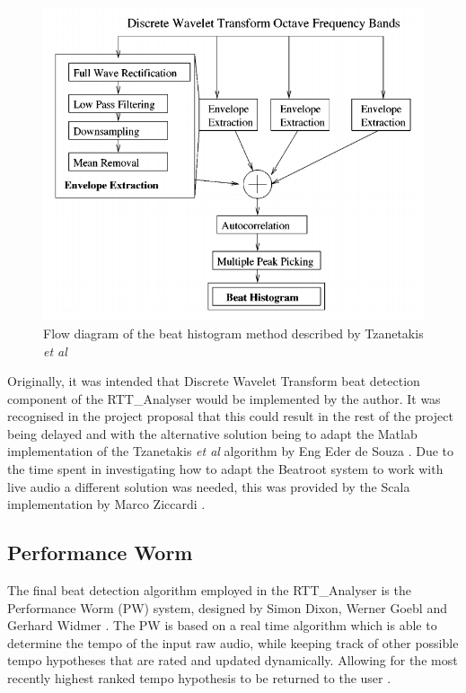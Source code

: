 \documentclass[a4paper, 11pt]{article}
\begin{document}
\begin{figure}[ht]
	\centering
	\includegraphics[scale=0.35]{images/dwtflow.jpg}
	\caption{Flow diagram of the beat histogram method described by Tzanetakis \textit{et al} \cite{tzane3}}
	\label{fig: dwtFlow}
\end{figure}


Originally, it was intended that Discrete Wavelet Transform beat detection component of the RTT\_Analyser would be implemented by the author. It was recognised in the project proposal that this could result in the rest of the project being delayed and with the alternative solution being to adapt the Matlab implementation of the Tzanetakis \textit{et al} \cite{tzane1} algorithm by Eng Eder de Souza \cite{desouze}. Due to the time spent in investigating how to adapt the Beatroot system to work with live audio a different solution was needed, this was provided by the Scala implementation by Marco Ziccardi \cite{marcoZin}.

\subsection{Performance Worm}
The final beat detection algorithm employed in the RTT\_Analyser is the Performance Worm (PW) system, designed by Simon Dixon, Werner Goebl and Gerhard Widmer \cite{dixonGoeblWidmer}. The PW is based on a real time algorithm which is able to determine the tempo of the input raw audio, while keeping track of other possible tempo hypotheses that are rated and updated dynamically. Allowing for the most recently highest ranked tempo hypothesis to be returned to the user \cite{dixonGoeblWidmer}. 
\end{document}

